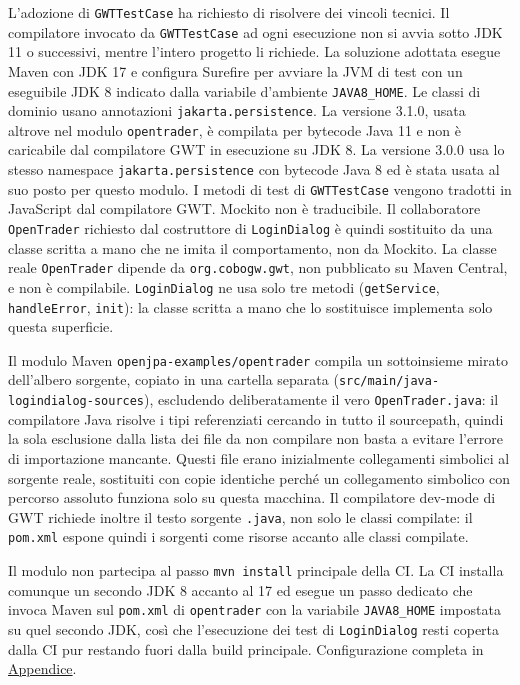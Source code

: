 L'adozione di \texttt{GWTTestCase} ha richiesto di risolvere dei
vincoli tecnici. Il compilatore invocato da \texttt{GWTTestCase}
ad ogni esecuzione non si avvia sotto JDK 11 o successivi, mentre l'intero progetto
li richiede. La soluzione adottata
esegue Maven con JDK 17 e configura Surefire
per avviare la JVM di test con un eseguibile JDK 8 indicato dalla variabile
d'ambiente \texttt{JAVA8\_HOME}.
Le classi di dominio usano annotazioni \texttt{jakarta.persistence}.
La versione 3.1.0, usata altrove nel modulo \texttt{opentrader}, è compilata
per bytecode Java 11 e non è caricabile dal compilatore GWT in esecuzione
su JDK 8. La versione 3.0.0 usa lo stesso namespace \texttt{jakarta.persistence}
con bytecode Java 8 ed è stata usata al suo posto per questo modulo.
I metodi di test di \texttt{GWTTestCase} vengono tradotti in
JavaScript dal compilatore GWT. Mockito non è traducibile. Il collaboratore \texttt{OpenTrader} richiesto dal costruttore
di \texttt{LoginDialog} è quindi sostituito da una classe scritta a mano
che ne imita il comportamento, non da Mockito.
La classe reale \texttt{OpenTrader} dipende da
\texttt{org.cobogw.gwt}, non pubblicato su Maven Central, e non è compilabile.
\texttt{LoginDialog} ne usa solo tre metodi (\texttt{getService},
\texttt{handleError}, \texttt{init}): la classe scritta a mano che lo
sostituisce implementa solo questa superficie.

Il modulo Maven \texttt{openjpa-examples/opentrader} compila un
sottoinsieme mirato dell'albero sorgente, copiato in una cartella separata
(\texttt{src/main/java-logindialog-sources}),
escludendo deliberatamente il vero \texttt{OpenTrader.java}: il
compilatore Java risolve i tipi referenziati cercando in tutto il
sourcepath, quindi la sola esclusione dalla lista dei file da non compilare
non basta a evitare l'errore di importazione mancante. Questi file erano
inizialmente collegamenti simbolici al sorgente reale, sostituiti con copie
identiche perché un collegamento simbolico con percorso assoluto funziona solo su questa
macchina. Il compilatore
dev-mode di GWT richiede inoltre il testo sorgente \texttt{.java}, non
solo le classi compilate: il
\texttt{pom.xml} espone quindi i sorgenti come risorse accanto alle
classi compilate.

Il modulo non partecipa al passo
\texttt{mvn install} principale della CI. La CI installa comunque un
secondo JDK 8 accanto al 17 ed esegue un passo
dedicato che invoca Maven sul \texttt{pom.xml} di \texttt{opentrader}
con la variabile \texttt{JAVA8\_HOME} impostata su quel secondo JDK,
così che l'esecuzione dei test di \texttt{LoginDialog} resti coperta
dalla CI pur restando fuori dalla build principale. Configurazione completa in
\hyperref[cmd:ci-config]{Appendice}.

